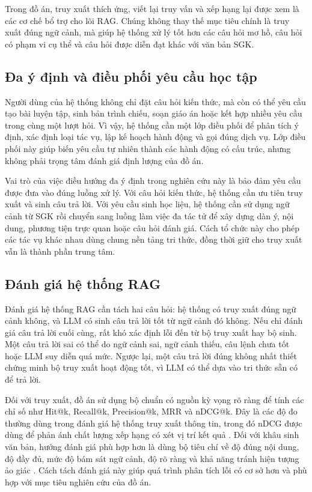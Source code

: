 \documentclass[../DoAn.tex]{subfiles}
\begin{document}
Trong đồ án, truy xuất thích ứng, viết lại truy vấn và xếp hạng lại được xem là các cơ chế bổ trợ cho lõi RAG. Chúng không thay thế mục tiêu chính là truy xuất đúng ngữ cảnh, mà giúp hệ thống xử lý tốt hơn các câu hỏi mơ hồ, câu hỏi có phạm vi cụ thể và câu hỏi được diễn đạt khác với văn bản SGK.

\subsection{Đa ý định và điều phối yêu cầu học tập}

Người dùng của hệ thống không chỉ đặt câu hỏi kiến thức, mà còn có thể yêu cầu tạo bài luyện tập, sinh bản trình chiếu, soạn giáo án hoặc kết hợp nhiều yêu cầu trong cùng một lượt hỏi. Vì vậy, hệ thống cần một lớp điều phối để phân tích ý định, xác định loại tác vụ, lập kế hoạch hành động và gọi đúng dịch vụ. Lớp điều phối này giúp biến yêu cầu tự nhiên thành các hành động có cấu trúc, nhưng không phải trọng tâm đánh giá định lượng của đồ án.

Vai trò của việc điều hướng đa ý định trong nghiên cứu này là bảo đảm yêu cầu được đưa vào đúng luồng xử lý. Với câu hỏi kiến thức, hệ thống cần ưu tiên truy xuất và sinh câu trả lời. Với yêu cầu sinh học liệu, hệ thống cần sử dụng ngữ cảnh từ SGK rồi chuyển sang luồng làm việc đa tác tử để xây dựng dàn ý, nội dung, phương tiện trực quan hoặc câu hỏi đánh giá. Cách tổ chức này cho phép các tác vụ khác nhau dùng chung nền tảng tri thức, đồng thời giữ cho truy xuất vẫn là thành phần trung tâm.

\subsection{Đánh giá hệ thống RAG}

Đánh giá hệ thống RAG cần tách hai câu hỏi: hệ thống có truy xuất đúng ngữ cảnh không, và LLM có sinh câu trả lời tốt từ ngữ cảnh đó không. Nếu chỉ đánh giá câu trả lời cuối cùng, rất khó xác định lỗi đến từ bộ truy xuất hay bộ sinh. Một câu trả lời sai có thể do ngữ cảnh sai, ngữ cảnh thiếu, câu lệnh chưa tốt hoặc LLM suy diễn quá mức. Ngược lại, một câu trả lời đúng không nhất thiết chứng minh bộ truy xuất hoạt động tốt, vì LLM có thể dựa vào tri thức sẵn có để trả lời.

Đối với truy xuất, đồ án sử dụng bộ chuẩn có nguồn kỳ vọng rõ ràng để tính các chỉ số như Hit@k, Recall@k, Precision@k, MRR và nDCG@k. Đây là các độ đo thường dùng trong đánh giá hệ thống truy xuất thông tin, trong đó nDCG được dùng để phản ánh chất lượng xếp hạng có xét vị trí kết quả \cite{thakur2021beir,jarvelin2002cumulated}. Đối với khâu sinh văn bản, hướng đánh giá phù hợp hơn là dùng bộ tiêu chí về độ đúng nội dung, độ đầy đủ, mức độ bám sát ngữ cảnh, độ rõ ràng và khả năng tránh hiện tượng ảo giác \cite{ji2023hallucination}. Cách tách đánh giá này giúp quá trình phân tích lỗi có cơ sở hơn và phù hợp với mục tiêu nghiên cứu của đồ án.
\end{document}
